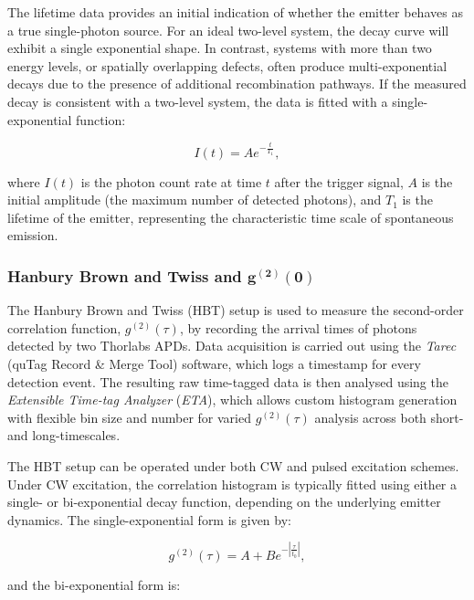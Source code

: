 The lifetime data provides an initial indication of whether the emitter behaves as a true single-photon source. For an ideal two-level system, the decay curve will exhibit a single exponential shape. In contrast, systems with more than two energy levels, or spatially overlapping defects, often produce multi-exponential decays due to the presence of additional recombination pathways. If the measured decay is consistent with a two-level system, the data is fitted with a single-exponential function:

\begin{equation}
    I(t) = A e^{-\frac{t}{T_1}},
    \label{eqn:lifetime}
\end{equation}

where $I(t)$ is the photon count rate at time $t$ after the trigger signal, $A$ is the initial amplitude (the maximum number of detected photons), and $T_1$ is the lifetime of the emitter, representing the characteristic time scale of spontaneous emission.


\subsubsection{Hanbury Brown and Twiss and $\mathbf{g^{(2)}(0)}$}

The Hanbury Brown and Twiss (HBT) setup is used to measure the second-order correlation function, $g^{(2)}(\tau)$, by recording the arrival times of photons detected by two Thorlabs APDs. Data acquisition is carried out using the \textit{Tarec} (quTag Record \& Merge Tool) software, which logs a timestamp for every detection event. The resulting raw time-tagged data is then analysed using the \textit{Extensible Time-tag Analyzer} (\textit{ETA}), which allows custom histogram generation with flexible bin size and number for varied $g^{(2)}(\tau)$ analysis across both short- and long-timescales.

The HBT setup can be operated under both CW and pulsed excitation schemes. Under CW excitation, the correlation histogram is typically fitted using either a single- or bi-exponential decay function, depending on the underlying emitter dynamics. The single-exponential form is given by:

\begin{equation}
    g^{(2)}(\tau) = A + B e^{-\left| \frac{\tau}{t_0} \right|},
    \label{eqn:single-decay-g2}
\end{equation}

and the bi-exponential form is:

